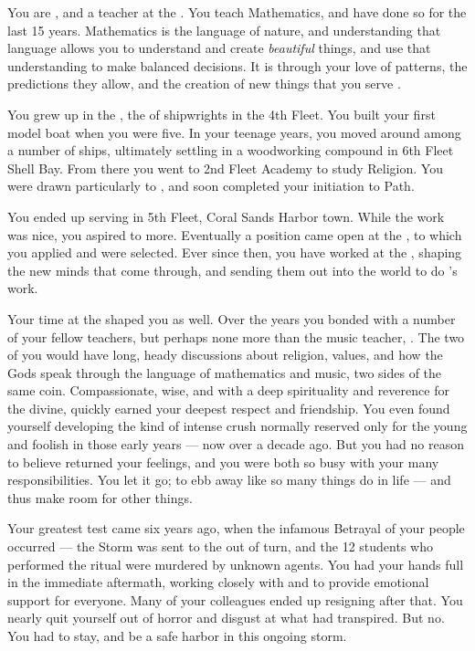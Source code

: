 \documentclass[char]{GL2020}
\begin{document}
\name{\cFlowPriest{}}

You are \cFlowPriest{\intro}, and a teacher at the \pSchool{}. You teach Mathematics, and have done so for the last 15 years. Mathematics is the language of nature, and understanding that language allows you to understand and create \emph{beautiful} things, and use that understanding to make balanced decisions. It is through your love of patterns, the predictions they allow, and the creation of new things that you serve \cFlow{\intro}.

You grew up in the \pShip{}, the \cFlowPriest{\offspring} of shipwrights in the 4th Fleet. You built your first model boat when you were five. In your teenage years, you moved around among a number of ships, ultimately settling in a woodworking compound in 6th Fleet Shell Bay. From there you went to 2nd Fleet Academy to study Religion. You were drawn particularly to \cFlow{}, and soon completed your initiation to \cFlow{\their} Path.

You ended up serving in 5th Fleet, Coral Sands Harbor town. While the work was nice, you aspired to more. Eventually a position came open at the \pSchool{}, to which you applied and were selected. Ever since then, you have worked at the \pSc{}, shaping the new minds that come through, and sending them out into the world to do \cFlow{}'s work.

Your time at the \pSchool{} shaped you as well. Over the years you bonded with a number of your fellow teachers, but perhaps none more than the music teacher, \cMusic{\intro}. The two of you would have long, heady discussions about religion, values, and how the Gods speak through the language of mathematics and music, two sides of the same coin. Compassionate, wise, and with a deep spirituality and reverence for the divine, \cMusic{} quickly earned your deepest respect and friendship. You even found yourself developing the kind of intense crush normally reserved only for the young and foolish in those early years — now over a decade ago. But you had no reason to believe \cMusic{} returned your feelings, and you were both so busy with your many responsibilities. You let it go; to ebb away like so many things do in life — and thus make room for other things.

Your greatest test came six years ago, when the infamous Betrayal of your people occurred — the Storm was sent to the \pShip{} out of turn, and the 12 students who performed the ritual were murdered by unknown agents. You had your hands full in the immediate aftermath, working closely with \cEthics{\intro} and \cMusic{} to provide emotional support for everyone. Many of your colleagues ended up resigning after that. You nearly quit yourself out of horror and disgust at what had transpired. But no. You had to stay, and be a safe harbor in this ongoing storm. 
\end{document}
